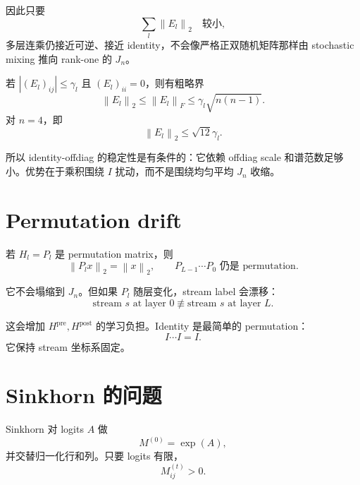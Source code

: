 \documentclass[UTF8,11pt]{ctexart}
\newcommand{\J}{J_n}
\newcommand{\Hpre}{H^{\mathrm{pre}}}
\newcommand{\Hpost}{H^{\mathrm{post}}}
\newcommand{\norm}[1]{\left\lVert #1 \right\rVert}
\begin{document}
因此只要
\begin{equation}
  \sum_l \norm{E_l}_2
  \quad\text{较小},
\end{equation}
多层连乘仍接近可逆、接近 identity，不会像严格正双随机矩阵那样由 stochastic mixing 推向 rank-one 的 $\J$。

若 $|(E_l)_{ij}|\le\gamma_l$ 且 $(E_l)_{ii}=0$，则有粗略界
\begin{equation}
  \norm{E_l}_2
  \le
  \norm{E_l}_F
  \le
  \gamma_l\sqrt{n(n-1)}.
\end{equation}
对 $n=4$，即
\begin{equation}
  \norm{E_l}_2
  \le
  \sqrt{12}\gamma_l.
\end{equation}

所以 identity-offdiag 的稳定性是有条件的：它依赖 offdiag scale 和谱范数足够小。优势在于乘积围绕 $I$ 扰动，而不是围绕均匀平均 $\J$ 收缩。

\section{Permutation drift}

若 $H_l=P_l$ 是 permutation matrix，则
\begin{equation}
  \norm{P_l x}_2=\norm{x}_2,
  \qquad
  P_{L-1}\cdots P_0 \text{ 仍是 permutation}.
\end{equation}

它不会塌缩到 $\J$。但如果 $P_l$ 随层变化，stream label 会漂移：
\begin{equation}
  \text{stream }s\text{ at layer }0
  \not\equiv
  \text{stream }s\text{ at layer }L.
\end{equation}

这会增加 $\Hpre,\Hpost$ 的学习负担。Identity 是最简单的 permutation：
\begin{equation}
  I\cdots I=I.
\end{equation}
它保持 stream 坐标系固定。

\section{Sinkhorn 的问题}

Sinkhorn 对 logits $A$ 做
\begin{equation}
  M^{(0)}=\exp(A),
\end{equation}
并交替归一化行和列。只要 logits 有限，
\begin{equation}
  M^{(t)}_{ij}>0.
\end{equation}
\end{document}
